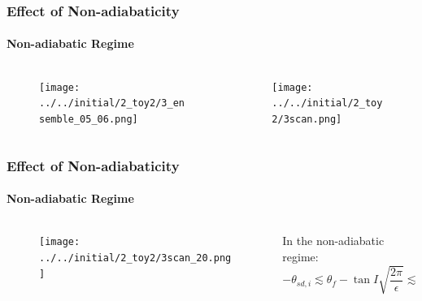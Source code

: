 \documentclass[dvipsnames]{beamer}
\begin{document}
\begin{frame}
    \frametitle{Effect of Non-adiabaticity}
    \framesubtitle{Non-adiabatic Regime}
    \begin{columns}
        \begin{column}{0.5\textwidth}
            \begin{figure}[t]
                \centering
                \texttt{[image: ../../initial/2\_toy2/3\_ensemble\_05\_06.png]}
            \end{figure}
        \end{column}
        \begin{column}{0.5\textwidth}
            \begin{figure}[t]
                \centering
                \texttt{[image: ../../initial/2\_toy2/3scan.png]}
            \end{figure}
        \end{column}
    \end{columns}
\end{frame}

\begin{frame}
    \frametitle{Effect of Non-adiabaticity}
    \framesubtitle{Non-adiabatic Regime}
    \begin{columns}
        \begin{column}{0.5\textwidth}
            \begin{figure}[t]
                \centering
                \texttt{[image: ../../initial/2\_toy2/3scan\_20.png]}
            \end{figure}
        \end{column}
        \begin{column}{0.5\textwidth}
            In the non-adiabatic regime:
            \begin{equation*}
                -\theta_{sd, i} \lesssim
                    \theta_{f} - \tan I \sqrt{\frac{2\pi}{\epsilon}} \lesssim
                    \theta_{sd, i}.
            \end{equation*}
        \end{column}
    \end{columns}
\end{frame}
\end{document}
